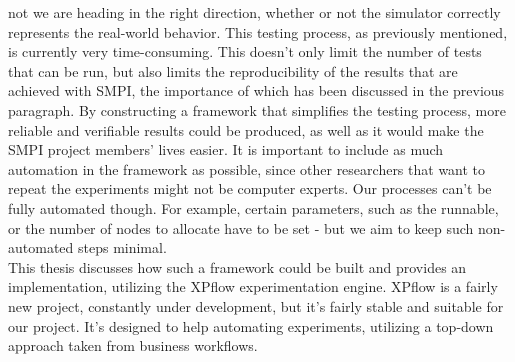 not we are heading in the right direction, whether or not the
simulator correctly represents the real-world behavior. This
testing process, as previously mentioned, is currently very
time-consuming. This doesn't only limit the number of tests that can
be run, but also limits the reproducibility of the
results that are achieved with SMPI, the importance of which has been
discussed in the previous paragraph. By constructing a framework that
simplifies the testing process, more reliable and verifiable results
could be produced, as well as it would make the SMPI project members'
lives easier. It is important to include as much automation in the
framework as possible, since other researchers that want to repeat the
experiments might not be computer experts. Our processes can't be
fully automated though. For example, certain parameters, such as the
runnable, or the number of nodes to allocate have to be set - but we
aim to keep such non-automated steps minimal.\\
This thesis discusses how such a framework could be built and provides
an implementation, utilizing the XPflow\cite{bn12_2} experimentation
engine. XPflow is a fairly new project, constantly under development,
but it's fairly stable and suitable for our project. It's designed to
help automating experiments, utilizing a top-down approach taken from
business workflows.\\
